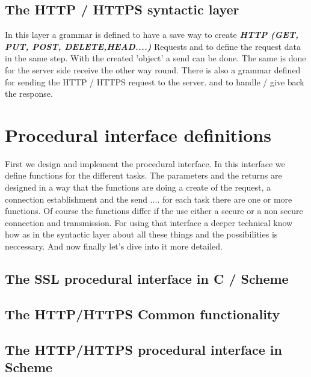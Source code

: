 \documentclass[10pt,a4paper,english]{article}
\newcommand{\abbrhighcol}[1]{\textbf{\textit{#1}}}
\begin{document}
\begin{multicols}{2}
\subsection{The HTTP / HTTPS  syntactic layer}
\begin{flushleft}
In this layer a grammar is defined to have a save way to create \abbrhighcol{ HTTP (GET, PUT, POST, DELETE,HEAD....)} Requests and to define the request data in the same step. With the created 'object' a send can be done. The same is done for the server side receive the other way round. There is also a grammar defined for sending the HTTP / HTTPS request to the server. and to handle / give back the response. 
\end{flushleft}


\section{Procedural interface definitions}
\begin{flushleft}
First we design and implement the procedural interface. In this interface we define functions for the different tasks. The parameters and the returns are designed in a way that  the functions are doing a create of the request, a connection establishment and the send .... for each task there  are  one or more functions. Of course the functions differ if the use either a secure or a non secure connection and transmission. For using that interface a deeper technical know how as in the syntactic layer about all these things and the possibilities is   neccessary.
And now finally let's dive into it more detailed.
\end{flushleft}
\subsection{The SSL procedural interface in C / Scheme}
\begin{flushleft}
\end{flushleft}
\subsection{The HTTP/HTTPS Common functionality}
\begin{flushleft}
\end{flushleft}
\subsection{The HTTP/HTTPS procedural interface in  Scheme}
\begin{flushleft}
\end{flushleft}

\end{multicols}
\end{document}

